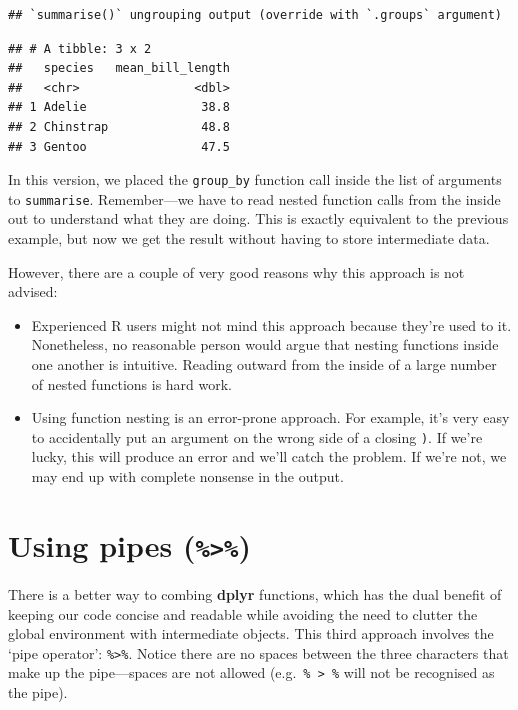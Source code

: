 \documentclass[
]{book}
\begin{document}
\begin{verbatim}
## `summarise()` ungrouping output (override with `.groups` argument)
\end{verbatim}

\begin{verbatim}
## # A tibble: 3 x 2
##   species   mean_bill_length
##   <chr>                <dbl>
## 1 Adelie                38.8
## 2 Chinstrap             48.8
## 3 Gentoo                47.5
\end{verbatim}

In this version, we placed the \texttt{group\_by} function call inside the list of arguments to \texttt{summarise}. Remember---we have to read nested function calls from the inside out to understand what they are doing. This is exactly equivalent to the previous example, but now we get the result without having to store intermediate data.

However, there are a couple of very good reasons why this approach is not advised:

\begin{itemize}
\item
  Experienced R users might not mind this approach because they're used to it. Nonetheless, no reasonable person would argue that nesting functions inside one another is intuitive. Reading outward from the inside of a large number of nested functions is hard work.
\item
  Using function nesting is an error-prone approach. For example, it's very easy to accidentally put an argument on the wrong side of a closing \texttt{)}. If we're lucky, this will produce an error and we'll catch the problem. If we're not, we may end up with complete nonsense in the output.
\end{itemize}

\hypertarget{using-pipes}{%
\section{\texorpdfstring{Using pipes (\texttt{\%\textgreater{}\%})}{Using pipes (\%\textgreater\%)}}\label{using-pipes}}

There is a better way to combing \textbf{dplyr} functions, which has the dual benefit of keeping our code concise and readable while avoiding the need to clutter the global environment with intermediate objects. This third approach involves the `pipe operator': \texttt{\%\textgreater{}\%}. Notice there are no spaces between the three characters that make up the pipe---spaces are not allowed (e.g.~\texttt{\%\ \textgreater{}\ \%} will not be recognised as the pipe).
\end{document}
